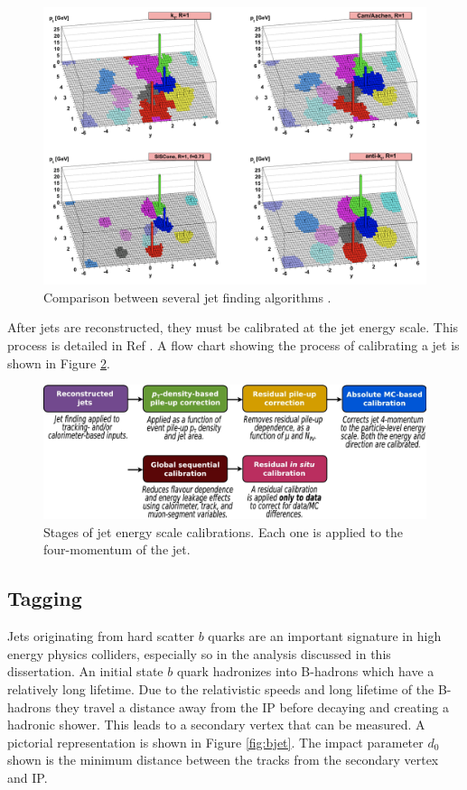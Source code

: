 		\begin{figure}[!ht]
		\centering
		\includegraphics[width=.5\textwidth,keepaspectratio=true]{chapters/chapter5_eventreconnstruction/images/anti-kt-comparison.png}
		\caption{\label{fig:anti-kt-comparison} Comparison between several jet finding algorithms \cite{anti-kt}.}
		\end{figure}

		After jets are reconstructed, they must be calibrated at the jet energy scale. This process is detailed in Ref \cite{jet-calibration}. A flow chart showing the process of calibrating a jet is shown in Figure \ref{fig:jet-calibration-diagram}.

		\begin{figure}[!ht]
			\centering
			\includegraphics[width=\textwidth,keepaspectratio=true]{chapters/chapter5_eventreconnstruction/images/jet_calibration_diagram.png}
			\caption{\label{fig:jet-calibration-diagram} Stages of jet energy scale calibrations. Each one is applied to the four-momentum of the jet. \cite{jet-calibration} }
		\end{figure}

		\subsection{\bjet Tagging}\label{ssec:flavor-tagging}
			Jets originating from hard scatter $b$ quarks are an important signature in high energy physics colliders, especially so in the analysis discussed in this dissertation. An initial state $b$ quark hadronizes into B-hadrons which have a relatively long lifetime. Due to the relativistic speeds and long lifetime of the B-hadrons they travel a distance away from the \gls{IP} before decaying and creating a hadronic shower. This leads to a secondary vertex that can be measured. A pictorial representation is shown in Figure \ref{fig:bjet}. The impact parameter $d_0$ shown is the minimum distance between the tracks from the secondary vertex and \gls{IP}. 

